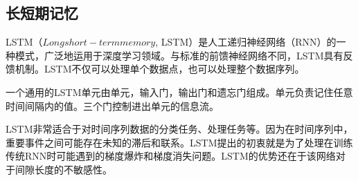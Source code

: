 
\subsection{长短期记忆}{LSTM}\cite{ wiki:LSTM}（$Long short-term memory$, LSTM）是人工递归神经网络（RNN）的一种模式，广泛地运用于深度学习领域。与标准的前馈神经网络不同，LSTM具有反馈机制。LSTM不仅可以处理单个数据点，也可以处理整个数据序列。

一个通用的LSTM单元由单元，输入门，输出门和遗忘门组成。单元负责记住任意时间间隔内的值。三个门控制进出单元的信息流。

LSTM非常适合于对时间序列数据的分类任务、处理任务等。因为在时间序列中，重要事件之间可能存在未知的滞后和联系。LSTM提出的初衷就是为了处理在训练传统RNN时可能遇到的梯度爆炸和梯度消失问题。LSTM的优势还在于该网络对于间隙长度的不敏感性。

